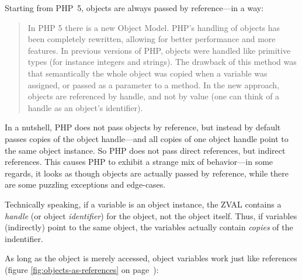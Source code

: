 Starting from PHP~5, objects are always passed by reference---in a way:~\cite{php-manual-migration5-oop}

\begin{quote}
In PHP 5 there is a new Object Model. PHP's handling of objects has been completely rewritten, allowing for better performance and more features. In previous versions of PHP, objects were handled like primitive types (for instance integers and strings). The drawback of this method was that semantically the whole object was copied when a variable was assigned, or passed as a parameter to a method. In the new approach, objects are referenced by handle, and not by value (one can think of a handle as an object's identifier).
\end{quote}

In a nutshell, PHP does not pass objects by reference, but instead by default passes copies of the object handle---and all copies of one object handle point to the same object instance. So PHP does not pass direct references, but indirect references. This causes PHP to exhibit a strange mix of behavior---in some regards, it looks as though objects are actually passed by reference, while there are some puzzling exceptions and edge-cases.

Technically speaking, if a variable is an object instance, the ZVAL contains a \emph{handle} (or object \emph{identifier}) for the object, not the object itself. Thus, if variables (indirectly) point to the same object, the variables actually contain \emph{copies} of the indentifier.~\cite{php-manual-oop-references}

As long as the object is merely accessed, object variables work just like references (figure \ref{fig:objects-as-references} on page~\pageref{fig:objects-as-references}):



